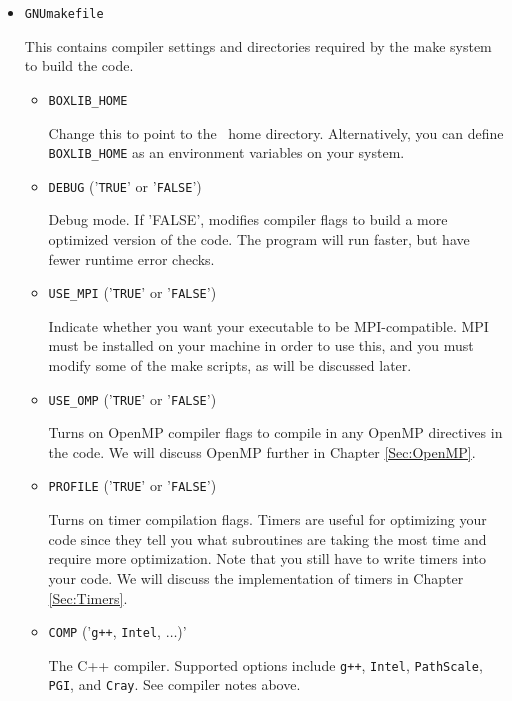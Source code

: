 \begin{itemize}
\item {\tt GNUmakefile}

This contains compiler settings and directories required by the make system to build the code.

  \begin{itemize}

    \item {\tt BOXLIB\_HOME}

    Change this to point to the \BoxLib\ home directory.  Alternatively, you can define {\tt BOXLIB\_HOME}
    as an environment variables on your system.

    \item {\tt DEBUG} ('{\tt TRUE}' or '{\tt FALSE}')
      
    Debug mode.  If 'FALSE', modifies compiler flags to build a more optimized version of the code.
    The program will run faster, but have fewer runtime error checks.

    \item {\tt USE\_MPI} ('{\tt TRUE}' or '{\tt FALSE}')

    Indicate whether you want your executable to be MPI-compatible.  MPI must be installed on your
    machine in order to use this, and you must modify some of the make scripts, as will be 
    discussed later.

    \item {\tt USE\_OMP} ('{\tt TRUE}' or '{\tt FALSE}')
    
    Turns on OpenMP compiler flags to compile in any OpenMP directives in the code.
    We will discuss OpenMP further in Chapter \ref{Sec:OpenMP}.

    \item {\tt PROFILE} ('{\tt TRUE}' or '{\tt FALSE}')

    Turns on timer compilation flags.  Timers are useful for optimizing your code since they tell you 
    what subroutines are taking the most time and require more optimization.  Note that you still have 
    to write timers into your code.  We will discuss the implementation of timers in Chapter \ref{Sec:Timers}.

    \item {\tt COMP} ('{\tt g++}, {\tt Intel}, $\ldots$)'

    The C++ compiler.  Supported options include {\tt g++}, {\tt Intel}, {\tt PathScale}, 
    {\tt PGI}, and {\tt Cray}.  See compiler notes above.


\end{itemize}
\end{itemize}
